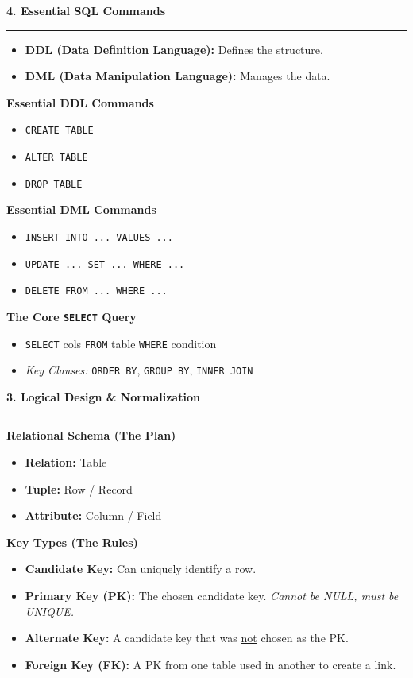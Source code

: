 \documentclass[a4paper, 8pt]{extarticle}
\newcommand{\sectionheading}[1]{\large\textbf{#1}\par\noindent\rule{\linewidth}{0.4pt}}
\newcommand{\subsectionheading}[1]{\normalsize\textbf{#1}}
\begin{document}
\begin{multicols}{2}
\vspace{1em}
\sectionheading{4. Essential SQL Commands}
\vspace{0.5em}
\begin{tcolorbox}[title=\textbf{SQL Sub-languages}]
    \begin{itemize}
        \item \textbf{DDL (Data Definition Language):} Defines the structure.
        \item \textbf{DML (Data Manipulation Language):} Manages the data.
    \end{itemize}
\end{tcolorbox}
\subsectionheading{Essential DDL Commands}
\begin{itemize}
    \item \texttt{CREATE TABLE}
    \item \texttt{ALTER TABLE}
    \item \texttt{DROP TABLE}
\end{itemize}
\subsectionheading{Essential DML Commands}
\begin{itemize}
    \item \texttt{INSERT INTO ... VALUES ...}
    \item \texttt{UPDATE ... SET ... WHERE ...}
    \item \texttt{DELETE FROM ... WHERE ...}
\end{itemize}
\subsectionheading{The Core \texttt{SELECT} Query}
\begin{itemize}
    \item \texttt{SELECT} cols \texttt{FROM} table \texttt{WHERE} condition
    \item \textit{Key Clauses:} \texttt{ORDER BY}, \texttt{GROUP BY}, \texttt{INNER JOIN}
\end{itemize}

\columnbreak %


\sectionheading{3. Logical Design & Normalization}
\vspace{0.5em}
\subsectionheading{Relational Schema (The Plan)}
\begin{itemize}
    \item \textbf{Relation:} Table
    \item \textbf{Tuple:} Row / Record
    \item \textbf{Attribute:} Column / Field
\end{itemize}
\subsectionheading{Key Types (The Rules)}
\begin{itemize}
    \item \textbf{Candidate Key:} Can uniquely identify a row.
    \item \textbf{Primary Key (PK):} The chosen candidate key. \textit{Cannot be NULL, must be UNIQUE.}
    \item \textbf{Alternate Key:} A candidate key that was \underline{not} chosen as the PK.
    \item \textbf{Foreign Key (FK):} A PK from one table used in another to create a link.
\end{itemize}


\end{multicols}
\end{document}
